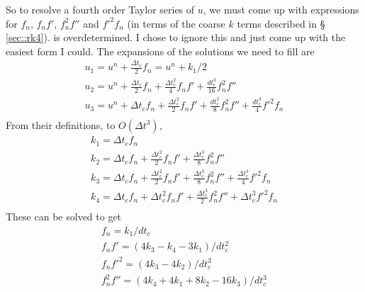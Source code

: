 \documentclass{article}
\newcommand{\dt}{{\Delta t}}
\begin{document}
So to resolve a fourth order Taylor series of $u$, we must come up with
expressions for $f_n$, $f_n f'$, $f_n^2 f''$ and ${f'}^2f_n$ 
(in terms of the coarse $k$ terms described in \S
\ref{sec::rk4}).    
is overdetermined.   I chose to ignore this and just come up with the
easiest form I could.  The expansions of the solutions we need to fill are
$$
\begin{array}{l}
u_1 = u^n + \frac{\dt_c}{2} f_n = u^n + k_1/2 \\
u_2 = u^n + \frac{\dt_c}{2} f_n  + \frac{\dt_c^2}{4} f_n f' +
\frac{dt_c^3}{16}f_n^2 f''\\
u_3 = u^n + \dt_c f_n  + \frac{\dt_c^2}{2} f_n f'
+\frac{dt_c^3}{8}f_n^2 f''  +\frac{dt_c^3}{4}{f'}^2 f_n\\
\end{array}
$$
From their definitions, to $O(\dt^3)$,
$$
\begin{array}{l}
k_1 = \dt_c f_n  \\
k_2 = \dt_c f_n + \frac{\dt_c^2}{2} f_n f'  + \frac{\dt_c^3}{8} f_n^2 f''\\
k_3 = \dt_c f_n + \frac{\dt_c^2}{2} f_n f'  + \frac{\dt_c^3}{8} f_n^2 f''
+ \frac{\dt_c^3}{4} {f'}^2f_n \\
k_4 = \dt_c f_n + \dt_c^2 f_n f'  + \frac{\dt_c^3}{2} f_n^2 f''
+ \dt_c^3 {f'}^2f_n \\
\end{array}
$$
These can be solved to get
$$
\begin{array}{l}
f_n = k_1/dt_c  \\
f_n f' = (4 k_3  - k_4 - 3 k_1)/dt_c^2\\
f_n {f'}^2 = (4 k_3  - 4 k_2 )/dt_c^3\\
f_n^2 f'' = (4 k_4  + 4 k_1 + 8 k_2 - 16 k_3 )/dt_c^3\\
\end{array}
$$


\end{document}
